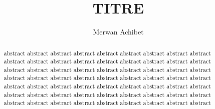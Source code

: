 \documentclass[10pt]{article}
\title{TITRE}
\author{Merwan Achibet}
\date{}
\begin{document}
\maketitle

\begin{abstract}
abstract abstract abstract abstract abstract abstract abstract
abstract abstract abstract abstract abstract abstract abstract
abstract abstract abstract abstract abstract abstract abstract
abstract abstract abstract abstract abstract abstract abstract
abstract abstract abstract abstract abstract abstract abstract
abstract abstract abstract abstract abstract abstract abstract
abstract abstract abstract abstract abstract abstract abstract
abstract abstract abstract abstract abstract abstract abstract
abstract abstract abstract abstract abstract abstract abstract
\end{abstract}
\end{document}
